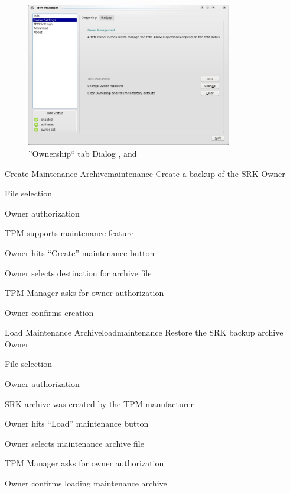 \documentclass[
  american        %
]{sirrixreport}
\begin{document}
\begin{figure}[h]
 \centering
 \includegraphics[width=0.8\textwidth]{images/uc_owner.jpg}
 \caption{''Ownership`` tab Dialog ,  and }
\end{figure}
\clearpage


\begin{usecase}{Create Maintenance Archive}{maintenance}
\ucdesc Create a backup of the SRK
\ucactors  Owner
\ucinclude 
   \begin{compactitem}
      \item File selection
      \item Owner authorization
   \end{compactitem}
\ucprecond TPM supports maintenance feature
\ucnormal 
 \item Owner hits ``Create'' maintenance button
 \item Owner selects destination for archive file
 \item TPM Manager asks for owner authorization
 \item Owner confirms creation 
\ucendflow
\end{usecase}
\clearpage

\begin{usecase}{Load Maintenance Archive}{loadmaintenance}
\ucdesc Restore the SRK backup archive
\ucactors  Owner
\ucinclude 
   \begin{compactitem}
      \item File selection
      \item Owner authorization
   \end{compactitem}
\ucprecond SRK archive was created by the TPM manufacturer
\ucnormal 
 \item Owner hits ``Load'' maintenance button
 \item Owner selects maintenance archive file
 \item TPM Manager asks for owner authorization
 \item Owner confirms loading maintenance archive
\ucendflow
\end{usecase}
\end{document}

